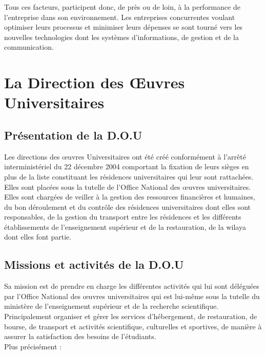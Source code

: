 Tous ces facteurs, participent donc, de près ou de loin, à la performance de l'entreprise dans son environnement\cite{perf-entreprise}. Les entreprises concurrentes voulant optimiser leurs processus et minimiser leurs dépenses se sont tourné vers les nouvelles technologies dont les systèmes d'informations, de gestion et de la communication.\\

\section{La Direction des Œuvres Universitaires}
\subsection{Présentation de la \acs{D.O.U}}
Les directions des œuvres Universitaires\cite{dou} ont été créé conformément à l'arrêté interministériel du 22 décembre 2004 comportant la fixation de leurs sièges en plus de la liste constituant les résidences universitaires qui leur sont rattachées. Elles sont placées sous la tutelle de l'Office National des œuvres universitaires.\\

Elles sont chargées de veiller à la gestion des ressources financières et humaines, du bon déroulement et du contrôle des résidences universitaires dont elles sont responsables, de la gestion du transport entre les résidences et les différents établissements de l'enseignement supérieur et de la restauration, de la wilaya dont elles font partie.\\

\subsection{Missions et activités de la \acs{D.O.U}}
Sa mission est de prendre en charge les différentes activités qui lui sont déléguées par l'Office National des œuvres universitaires\cite{onou-arrete} qui est lui-même sous la tutelle du ministère de l'enseignement supérieur et de la recherche scientifique.\\

Principalement organiser et gérer les services d'hébergement, de restauration, de bourse, de transport et activités scientifique, culturelles et sportives, de manière à assurer la satisfaction des besoins de l’étudiants.\\

Plus précisément :

